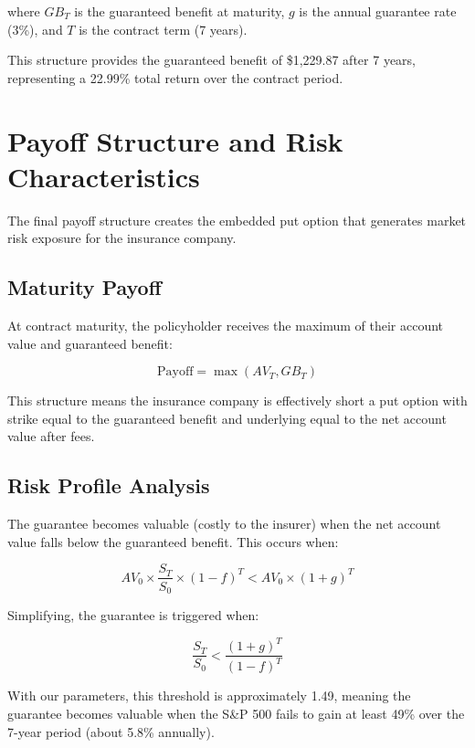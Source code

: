\documentclass[12pt,a4paper]{report}
\begin{document}
where $GB_T$ is the guaranteed benefit at maturity, $g$ is the annual guarantee rate (3\%), and $T$ is the contract term (7 years).

This structure provides the guaranteed benefit of \$1,229.87 after 7 years, representing a 22.99\% total return over the contract period.

\section{Payoff Structure and Risk Characteristics}

The final payoff structure creates the embedded put option that generates market risk exposure for the insurance company.

\subsection{Maturity Payoff}

At contract maturity, the policyholder receives the maximum of their account value and guaranteed benefit:

\begin{equation}
\text{Payoff} = \max(AV_T, GB_T)
\end{equation}

This structure means the insurance company is effectively short a put option with strike equal to the guaranteed benefit and underlying equal to the net account value after fees.

\subsection{Risk Profile Analysis}

The guarantee becomes valuable (costly to the insurer) when the net account value falls below the guaranteed benefit. This occurs when:

\begin{equation}
AV_0 \times \frac{S_T}{S_0} \times (1-f)^T < AV_0 \times (1+g)^T
\end{equation}

Simplifying, the guarantee is triggered when:

\begin{equation}
\frac{S_T}{S_0} < \frac{(1+g)^T}{(1-f)^T}
\end{equation}

With our parameters, this threshold is approximately 1.49, meaning the guarantee becomes valuable when the S\&P 500 fails to gain at least 49\% over the 7-year period (about 5.8\% annually).
\end{document}
